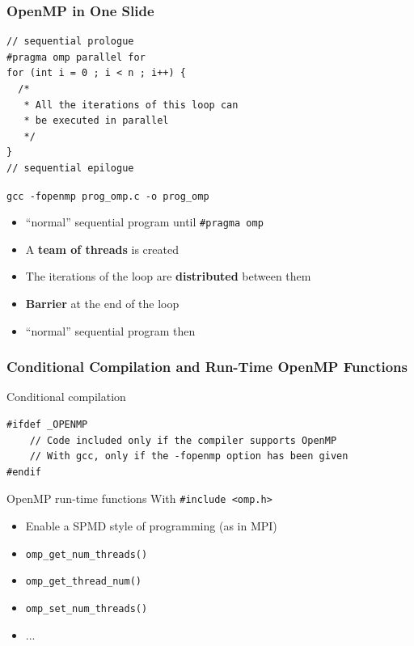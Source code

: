 \documentclass{beamer}
\begin{document}

\begin{frame}[fragile=singleslide]
  \frametitle{OpenMP in One Slide}

    \begin{verbatim}
// sequential prologue
#pragma omp parallel for
for (int i = 0 ; i < n ; i++) {
  /*
   * All the iterations of this loop can
   * be executed in parallel
   */
}
// sequential epilogue 
\end{verbatim}


\texttt{gcc \alert{-fopenmp} prog\_omp.c -o prog\_omp}

\medskip

\begin{itemize}
\item ``normal'' sequential program until \texttt{\#pragma omp}
\item A \textbf{team of threads} is created
\item The iterations of the loop are \textbf{distributed} between them
\item \textbf{Barrier} at the end of the loop
\item ``normal'' sequential program then
\end{itemize}
\end{frame}



\begin{frame}[fragile=singleslide]
  \frametitle{Conditional Compilation and Run-Time OpenMP Functions}

\begin{block}{Conditional compilation}
\begin{verbatim}
#ifdef _OPENMP
    // Code included only if the compiler supports OpenMP
    // With gcc, only if the -fopenmp option has been given
#endif
\end{verbatim}
\end{block}


\begin{block}{OpenMP run-time functions}
  With \texttt{#include <omp.h>}

\begin{itemize}
\item Enable a SPMD style of programming (as in MPI)
\item \texttt{omp_get_num_threads()}
\item \texttt{omp_get_thread_num()}
\item \texttt{omp_set_num_threads()}
\item ...
\end{itemize}
\end{block}

\end{frame}
\end{document}

